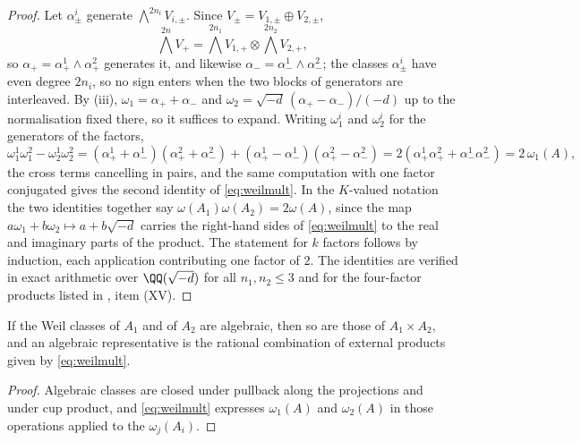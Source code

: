 \begin{proof}
Let $\alpha_{\pm}^{i}$ generate $\bigwedge^{2n_{i}}V_{i,\pm}$. Since
$V_{\pm}=V_{1,\pm}\oplus V_{2,\pm}$,
\[
  \textstyle\bigwedge^{2n}V_{+}=\bigwedge^{2n_{1}}V_{1,+}\otimes
  \bigwedge^{2n_{2}}V_{2,+},
\]
so $\alpha_{+}=\alpha_{+}^{1}\wedge\alpha_{+}^{2}$ generates it, and likewise
$\alpha_{-}=\alpha_{-}^{1}\wedge\alpha_{-}^{2}$; the classes
$\alpha_{\pm}^{i}$ have even degree $2n_{i}$, so no sign enters when the two
blocks of generators are interleaved. By
(iii), $\omega_{1}=\alpha_{+}+\alpha_{-}$ and
$\omega_{2}=\sqrt{-d}\,(\alpha_{+}-\alpha_{-})/(-d)$ up to the normalisation
fixed there, so it suffices to expand. Writing $\omega_{1}^{i}$ and
$\omega_{2}^{i}$ for the generators of the factors,
\[
  \omega_{1}^{1}\omega_{1}^{2}-\omega_{2}^{1}\omega_{2}^{2}
  =(\alpha_{+}^{1}+\alpha_{-}^{1})(\alpha_{+}^{2}+\alpha_{-}^{2})
  +(\alpha_{+}^{1}-\alpha_{-}^{1})(\alpha_{+}^{2}-\alpha_{-}^{2})
  =2(\alpha_{+}^{1}\alpha_{+}^{2}+\alpha_{-}^{1}\alpha_{-}^{2})
  =2\,\omega_{1}(A),
\]
the cross terms cancelling in pairs, and the same computation with one factor
conjugated gives the second identity of \eqref{eq:weilmult}. In the $K$-valued
notation the two identities together say
$\omega(A_{1})\omega(A_{2})=2\omega(A)$, since the map
$a\omega_{1}+b\omega_{2}\mapsto a+b\sqrt{-d}$ carries the right-hand sides of
\eqref{eq:weilmult} to the real and imaginary parts of the product. The
statement for $k$ factors follows by induction, each application contributing
one factor of $2$. The identities are verified in exact arithmetic over
$\QQ(\sqrt{-d})$ for all $n_{1},n_{2}\le3$ and for the four-factor products
listed in , item (XV).
\end{proof}

\begin{corollary}\label{cor:prodalg}
If the Weil classes of $A_{1}$ and of $A_{2}$ are algebraic, then so are those
of $A_{1}\times A_{2}$, and an algebraic representative is the rational
combination of external products given by \eqref{eq:weilmult}.
\end{corollary}

\begin{proof}
Algebraic classes are closed under pullback along the projections and under
cup product, and \eqref{eq:weilmult} expresses $\omega_{1}(A)$ and
$\omega_{2}(A)$ in those operations applied to the $\omega_{j}(A_{i})$.
\end{proof}

